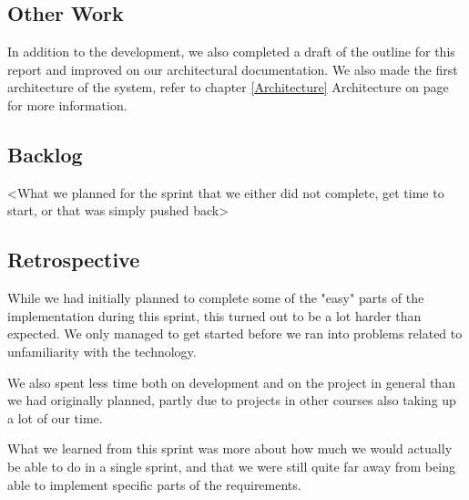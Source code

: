 \subsection{Other Work}
In addition to the development, we also completed a draft of the outline for this report and improved on our architectural documentation.
We also made the first architecture of the system, refer to chapter \ref{Architecture} Architecture on page \pageref{Architecture} for more information.

\subsection{Backlog}
<What we planned for the sprint that we either did not complete, get time to start, or that was simply pushed back>

\subsection{Retrospective}
While we had initially planned to complete some of the "easy" parts of the implementation during this sprint, this turned out to be a lot harder than expected. We only managed to get started before we ran into problems related to unfamiliarity with the technology.

We also spent less time both on development and on the project in general than we had originally planned, partly due to projects in other courses also taking up a lot of our time.

What we learned from this sprint was more about how much we would actually be able to do in a single sprint, and that we were still quite far away from being able to implement specific parts of the requirements.

